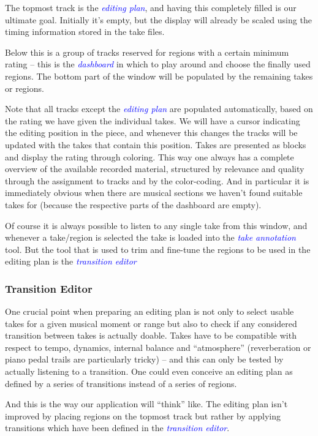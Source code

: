 \documentclass[11pt,a4paper]{article}
\newcommand*{\term}[1]{\textcolor{blue}{\emph{#1}}}
\begin{document}
The topmost track is the \term{editing plan}, and having this completely filled
is our ultimate goal.
Initially it's empty, but the display will already be scaled using the timing
information stored in the take files.

Below this is a group of tracks reserved for regions with a certain minimum
rating -- this is the \term{dashboard} in which to play around and choose the finally
used regions.
The bottom part of the window will be populated by the remaining takes or
regions.

Note that all tracks except the \term{editing plan} are populated automatically, based
on the rating we have given the individual takes.
We will have a cursor indicating the editing position in the piece, and
whenever this changes the tracks will be updated with the takes that contain
this position.
Takes are presented as blocks and display the rating through coloring.
This way one always has a complete overview of the available recorded material,
structured by relevance and quality through the assignment to tracks and by the
color-coding.
And in particular it is immediately obvious when there are musical sections we
haven't found suitable takes for (because the respective parts of the
dashboard are empty).

Of course it is always possible to listen to any single take from this window,
and whenever a take/region is selected the take is loaded into the \term{take
annotation} tool.
But the tool that is used to trim and fine-tune the regions to be used in the
editing plan is the \term{transition editor}

\subsubsection{Transition Editor}

One crucial point when preparing an editing plan is not only to select usable
takes for a given musical moment or range but also to check if any considered
transition between takes is actually doable.
Takes have to be compatible with respect to tempo, dynamics, internal balance
and “atmosphere” (reverberation or piano pedal trails are particularly tricky)
-- and this can only be tested by actually listening to a transition.
One could even conceive an editing plan as defined by a series of transitions
instead of a series of regions.

And this is the way our application will “think” like.
The editing plan isn't improved by placing regions on the topmost track but
rather by applying transitions which have been defined in the \term{transition
editor}.
\end{document}
